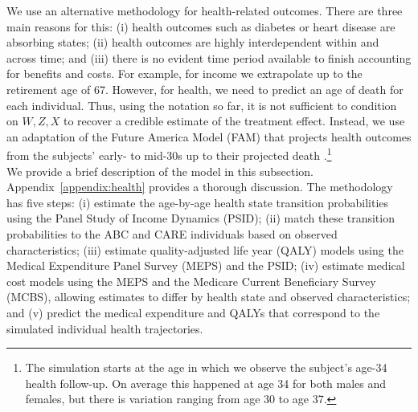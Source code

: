 \noindent We use an alternative methodology for health-related outcomes. There are three main reasons for this: (i) health outcomes such as diabetes or heart disease are absorbing states; (ii) health outcomes are highly interdependent within and across time; and (iii) there is no evident time period available to finish accounting for benefits and costs. For example, for income we extrapolate up to the retirement age of 67. However, for health, we need to predict an age of death for each individual. Thus, using the notation so far, it is not sufficient to condition on $W, Z, X$ to recover a credible estimate of the treatment effect. Instead, we use an adaptation of the Future America Model (FAM) that projects health outcomes from the subjects' early- to mid-30s up to their projected death \citep{Goldman_etal_2015_Future-Elderly-Model-Report}.\footnote{The simulation starts at the age in which we observe the subject's age-34 health follow-up. On average this happened at age 34 for both males and females, but there is variation ranging from age 30 to age 37.}\\

\noindent We provide a brief description of the model in this subsection. Appendix~\ref{appendix:health} provides a thorough discussion. The methodology has five steps: (i) estimate the age-by-age health state transition probabilities using the Panel Study of Income Dynamics (PSID); (ii) match these transition probabilities to the ABC and CARE individuals based on observed characteristics; (iii) estimate quality-adjusted life year (QALY) models using the Medical Expenditure Panel Survey (MEPS) and the PSID; (iv) estimate medical cost models using the MEPS and the Medicare Current Beneficiary Survey (MCBS), allowing estimates to differ by health state and observed characteristics; and (v) predict the medical expenditure and QALYs that correspond to the simulated individual health trajectories. \\

